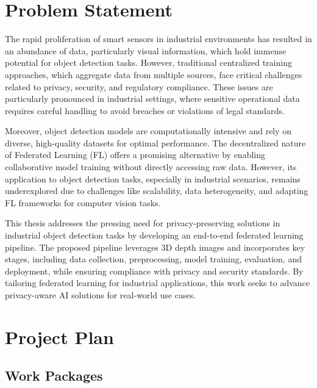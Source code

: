 \documentclass[thesis]{mas_proposal}
\begin{document}
\section{Problem Statement}

\indent \indent The rapid proliferation of smart sensors in industrial environments has resulted in an abundance of data, particularly visual information, which hold immense potential for object detection tasks. However, traditional centralized training approaches, which aggregate data from multiple sources, face critical challenges related to privacy, security, and regulatory compliance. These issues are particularly pronounced in industrial settings, where sensitive operational data requires careful handling to avoid breaches or violations of legal standards.

Moreover, object detection models are computationally intensive and rely on diverse, high-quality datasets for optimal performance. The decentralized nature of Federated Learning (FL) offers a promising alternative by enabling collaborative model training without directly accessing raw data. However, its application to object detection tasks, especially in industrial scenarios, remains underexplored due to challenges like scalability, data heterogeneity, and adapting FL frameworks for computer vision tasks.

This thesis addresses the pressing need for privacy-preserving solutions in industrial object detection tasks by developing an end-to-end federated learning pipeline. The proposed pipeline leverages 3D depth images and incorporates key stages, including data collection, preprocessing, model training, evaluation, and deployment, while ensuring compliance with privacy and security standards. By tailoring federated learning for industrial applications, this work seeks to advance privacy-aware AI solutions for real-world use cases.

\section{Project Plan}

\subsection{Work Packages}
\end{document}
